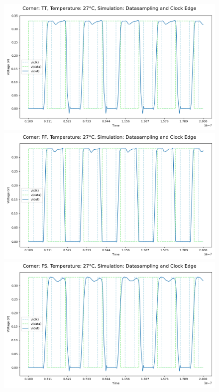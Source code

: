 \begin{figure}[H]
    \centering
    \includegraphics[height= 0.21\textheight]{figures/aimspice/TT/27/W1.csv.png}
    \vspace{5pt}
    \includegraphics[height= 0.21\textheight]{figures/aimspice/FF/27/W1.csv.png}
    \vspace{5pt}
    \includegraphics[height= 0.21\textheight]{figures/aimspice/FS/27/W1.csv.png}

\end{figure}
